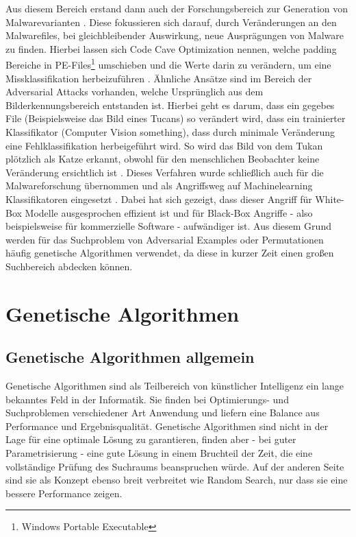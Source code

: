 Aus diesem Bereich erstand dann auch der Forschungsbereich zur Generation von Malwarevarianten \cite{jin_2023_on}. Diese fokussieren sich darauf, durch Veränderungen an den Malwarefiles, bei gleichbleibender Auswirkung, neue Ausprägungen von Malware zu finden. Hierbei lassen sich Code Cave Optimization nennen, welche padding Bereiche in PE-Files\footnote{Windows Portable Executable} umschieben und die Werte darin zu verändern, um eine Missklassifikation herbeizuführen \cite{yuste_2022_optimization}. Ähnliche Ansätze sind im Bereich der Adversarial Attacks vorhanden, welche Ursprünglich aus dem Bilderkennungsbereich entstanden ist. Hierbei geht es darum, dass ein gegebes File (Beispielsweise das Bild eines Tucans) so verändert wird, dass ein trainierter Klassifikator (Computer Vision something), dass durch minimale Veränderung eine Fehlklassifikation herbeigeführt wird. So wird das Bild von dem Tukan plötzlich als Katze erkannt, obwohl für den menschlichen Beobachter keine Veränderung ersichtlich ist \cite{demetrio_2024_formalizing}. Dieses Verfahren wurde schließlich auch für die Malwareforschung übernommen und als Angriffsweg auf Machinelearning Klassifikatoren eingesetzt \cite{demetrio_2021_functionalitypreserving}. Dabei hat sich gezeigt, dass dieser Angriff für White-Box Modelle ausgesprochen effizient ist und für Black-Box Angriffe - also beispielsweise für kommerzielle Software - aufwändiger ist\cite{yuste_2022_optimization}. Aus diesem Grund werden für das Suchproblem von Adversarial Examples oder Permutationen häufig genetische Algorithmen verwendet\cite{demetrio_2021_functionalitypreserving}, da diese in kurzer Zeit einen großen Suchbereich abdecken können. \label{adversarial_example}

\section{Genetische Algorithmen}
\subsection{Genetische Algorithmen allgemein}
Genetische Algorithmen sind als Teilbereich von künstlicher Intelligenz ein lange bekanntes Feld in der Informatik. Sie finden bei Optimierungs- und Suchproblemen verschiedener Art Anwendung und liefern eine Balance aus Performance und Ergebnisqualität. Genetische Algorithmen sind nicht in der Lage für eine optimale Lösung zu garantieren, finden aber - bei guter Parametrisierung - eine gute Lösung in einem Bruchteil der Zeit, die eine vollständige Prüfung des Suchraums beanspruchen würde. Auf der anderen Seite sind sie als Konzept ebenso breit verbreitet wie Random Search, nur dass sie eine bessere Performance zeigen.

